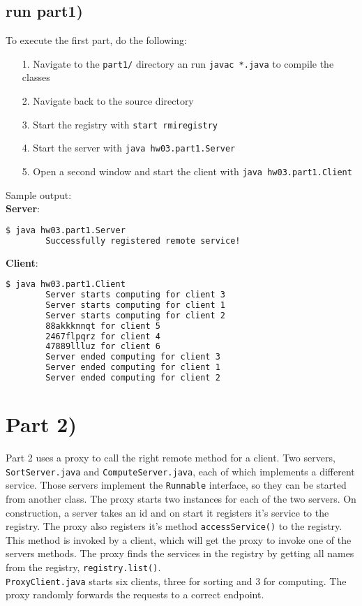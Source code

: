 \documentclass{article}
\begin{document}
    \subsection*{run part1)}
    
      To execute the first part, do the following:
      \begin{itemize}
    	\item[1.] Navigate to the \texttt{part1/} directory an run \texttt{javac *.java} to compile the classes
    	\item[2.] Navigate back to the source directory
    	\item[3.] Start the registry with \texttt{start rmiregistry}
    	\item[4.] Start the server with \texttt{java hw03.part1.Server}
    	\item[5.] Open a second window and start the client with \texttt{java hw03.part1.Client}
      \end{itemize}
      Sample output:\\
      \textbf{Server}:\\
      \begin{lstlisting}[language=sh]
        $ java hw03.part1.Server
        Successfully registered remote service!
      \end{lstlisting}
      \textbf{Client}:\\
      \begin{lstlisting}[language=sh]
        $ java hw03.part1.Client
        Server starts computing for client 3
        Server starts computing for client 1
        Server starts computing for client 2
        88akkknnqt for client 5
        2467flpqrz for client 4
        47889llluz for client 6
        Server ended computing for client 3
        Server ended computing for client 1
        Server ended computing for client 2
      \end{lstlisting}  
      
  \section*{Part 2)}
  
    Part 2 uses a proxy to call the right remote method for a client. Two servers, \texttt{SortServer.java} and \texttt{ComputeServer.java}, each of which implements a different service. Those servers implement the \texttt{Runnable} interface, so they can be started from another class. The proxy starts two instances for each of the two servers. On construction, a server takes an id and on start it registers it's service to the registry. The proxy also registers it's method \texttt{accessService()} to the registry. This method is invoked by a client, which will get the proxy to invoke one of the servers methods. The proxy finds the services in the registry by getting all names from the registry, \texttt{registry.list()}.\\
    \texttt{ProxyClient.java} starts six clients, three for sorting and 3 for computing. The proxy randomly forwards the requests to a correct endpoint. 
    
\end{document}

